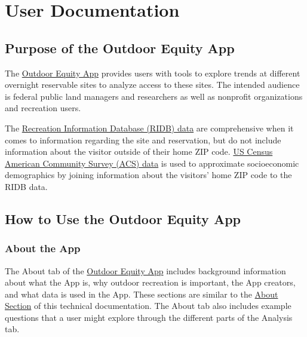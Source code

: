 \documentclass[
  11 pt,
  openany]{book}
\begin{document}
\hypertarget{user-documentation}{%
\chapter{User Documentation}\label{user-documentation}}

\hypertarget{purpose-of-the-outdoor-equity-app}{%
\section{Purpose of the Outdoor Equity App}\label{purpose-of-the-outdoor-equity-app}}

The \href{https://shinyapps.bren.ucsb.edu/oe_app/}{Outdoor Equity App} provides users with tools to explore trends at different overnight reservable sites to analyze access to these sites. The intended audience is federal public land managers and researchers as well as nonprofit organizations and recreation users.

The \href{https://ridb.recreation.gov/landing}{Recreation Information Database (RIDB) data} are comprehensive when it comes to information regarding the site and reservation, but do not include information about the visitor outside of their home ZIP code. \href{https://www.census.gov/programs-surveys/acs/data.html}{US Census American Community Survey (ACS) data} is used to approximate socioeconomic demographics by joining information about the visitors' home ZIP code to the RIDB data.

\hypertarget{how-to-use-the-outdoor-equity-app}{%
\section{How to Use the Outdoor Equity App}\label{how-to-use-the-outdoor-equity-app}}

\hypertarget{about-the-app}{%
\subsection{About the App}\label{about-the-app}}

The About tab of the \href{https://shinyapps.bren.ucsb.edu/oe_app/}{Outdoor Equity App} includes background information about what the App is, why outdoor recreation is important, the App creators, and what data is used in the App. These sections are similar to the \protect\hyperlink{about}{About Section} of this technical documentation. The About tab also includes example questions that a user might explore through the different parts of the Analysis tab.
\end{document}
